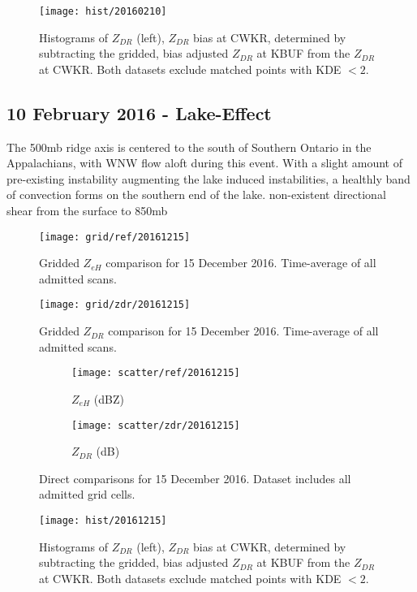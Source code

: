 \begin{figure}[p]
\texttt{[image: hist/20160210]}\centering
\caption{Histograms of $Z_{DR}$ (left), $Z_{DR}$ bias at CWKR, determined by subtracting the gridded, bias adjusted $Z_{DR}$ at KBUF from the $Z_{DR}$ at CWKR. Both datasets exclude matched points with KDE $< 2$. } 
\label{fig:hist_20160210}
\end{figure}

\subsection{10 February 2016 - Lake-Effect}
The 500mb ridge axis is centered to the south of Southern Ontario in the Appalachians, with WNW flow aloft during this event. With a slight amount of pre-existing instability augmenting the lake induced instabilities, a healthly band of convection forms on the southern end of the lake. 
non-existent directional shear from the surface to 850mb
\begin{figure}[p]
\texttt{[image: grid/ref/20161215]}
\caption{Gridded $Z_{eH}$ comparison for 15 December 2016. Time-average of all admitted scans.} 
\label{fig:grid_ref_20161215}
\end{figure}

\begin{figure}[p]
\texttt{[image: grid/zdr/20161215]}
\caption{Gridded $Z_{DR}$ comparison for 15 December 2016. Time-average of all admitted scans.} 
\label{fig:grid_zdr_20161215}
\end{figure}

\begin{figure}[p]
\centering
   \begin{subfigure}{0.49\linewidth} \centering
     \texttt{[image: scatter/ref/20161215]}
     \caption{$Z_{eH}$ (dBZ)}\label{fig:scatter_ref_20161215}
   \end{subfigure}
   \begin{subfigure}{0.49\linewidth} \centering
     \texttt{[image: scatter/zdr/20161215]}
     \caption{$Z_{DR}$ (dB)}\label{fig:scatter_zdr_20161215}
   \end{subfigure}
\caption{Direct comparisons for 15 December 2016. Dataset includes all admitted grid cells.} \label{fig:scatter_20161215}
\end{figure}

\begin{figure}[p]
\texttt{[image: hist/20161215]}\centering
\caption{Histograms of $Z_{DR}$ (left), $Z_{DR}$ bias at CWKR, determined by subtracting the gridded, bias adjusted $Z_{DR}$ at KBUF from the $Z_{DR}$ at CWKR. Both datasets exclude matched points with KDE $< 2$. } 
\label{fig:hist_20161215}
\end{figure}

